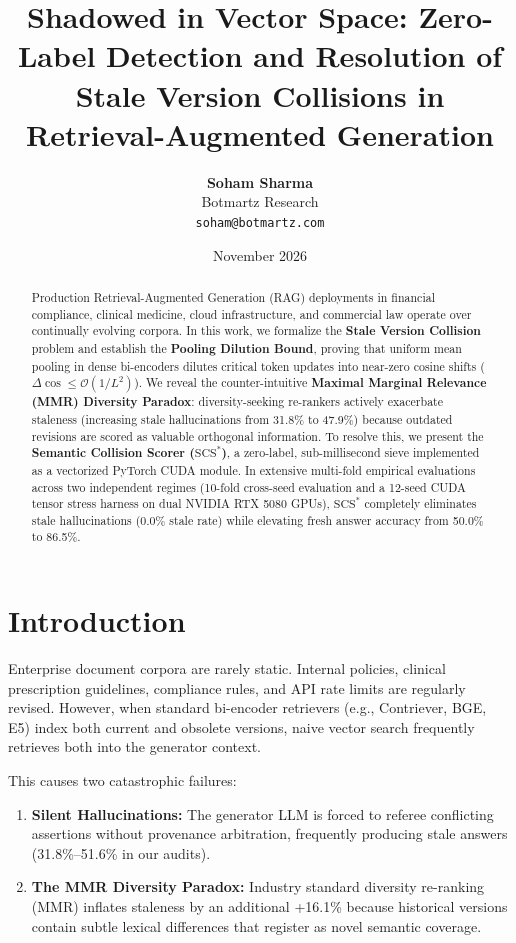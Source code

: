 \documentclass[11pt,a4paper]{article}
\title{\textbf{Shadowed in Vector Space: Zero-Label Detection and Resolution of Stale Version Collisions in Retrieval-Augmented Generation}}
\author{
  \textbf{Soham Sharma}\\
  Botmartz Research\\
  \texttt{soham@botmartz.com}
}
\date{November 2026}
\theoremstyle{definition}
\begin{document}
\maketitle

\begin{abstract}
Production Retrieval-Augmented Generation (RAG) deployments in financial compliance, clinical medicine, cloud infrastructure, and commercial law operate over continually evolving corpora. In this work, we formalize the \textbf{Stale Version Collision} problem and establish the \textbf{Pooling Dilution Bound}, proving that uniform mean pooling in dense bi-encoders dilutes critical token updates into near-zero cosine shifts ($\Delta \cos \le \mathcal{O}(1/L^2)$). We reveal the counter-intuitive \textbf{Maximal Marginal Relevance (MMR) Diversity Paradox}: diversity-seeking re-rankers actively exacerbate staleness (increasing stale hallucinations from 31.8\% to 47.9\%) because outdated revisions are scored as valuable orthogonal information. To resolve this, we present the \textbf{Semantic Collision Scorer ($\text{SCS}^*$)}, a zero-label, sub-millisecond sieve implemented as a vectorized PyTorch CUDA module. In extensive multi-fold empirical evaluations across two independent regimes (10-fold cross-seed evaluation and a 12-seed CUDA tensor stress harness on dual NVIDIA RTX 5080 GPUs), $\text{SCS}^*$ completely eliminates stale hallucinations (0.0\% stale rate) while elevating fresh answer accuracy from 50.0\% to 86.5\%.
\end{abstract}

\section{Introduction}
Enterprise document corpora are rarely static. Internal policies, clinical prescription guidelines, compliance rules, and API rate limits are regularly revised. However, when standard bi-encoder retrievers (e.g., Contriever, BGE, E5) index both current and obsolete versions, naive vector search frequently retrieves both into the generator context. 

This causes two catastrophic failures:
\begin{enumerate}
    \item \textbf{Silent Hallucinations:} The generator LLM is forced to referee conflicting assertions without provenance arbitration, frequently producing stale answers (31.8\%--51.6\% in our audits).
    \item \textbf{The MMR Diversity Paradox:} Industry standard diversity re-ranking (MMR) inflates staleness by an additional +16.1\% because historical versions contain subtle lexical differences that register as novel semantic coverage.
\end{enumerate}
\end{document}
